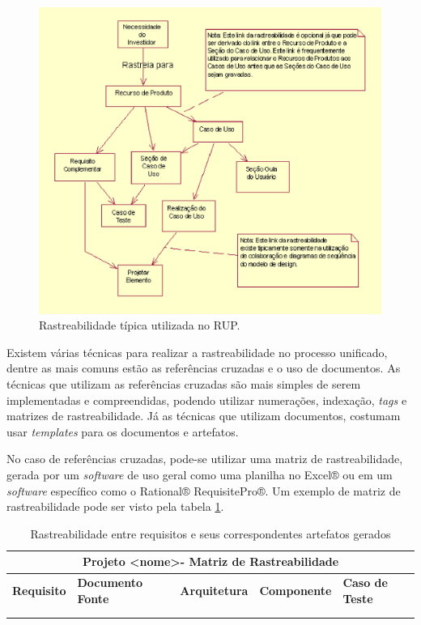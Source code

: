 \begin{figure}[htb]
\centering
  \includegraphics[keepaspectratio=true,scale=0.9]
  {figuras/rastreabilidade_tipica.eps}
  \caption{Rastreabilidade típica utilizada no RUP.~\cite{rup1}}
  \label{common-tracebility}
\end{figure}

\clearpage{}

Existem várias técnicas para realizar a rastreabilidade no processo unificado, dentre as mais comuns estão as referências cruzadas e o uso de documentos. As técnicas que utilizam as referências cruzadas são mais simples de serem implementadas e compreendidas, podendo utilizar numerações, indexação, \textit{tags} e matrizes de rastreabilidade. Já as técnicas que utilizam documentos, costumam usar \textit{templates} para os documentos e artefatos.

No caso de referências cruzadas, pode-se utilizar uma matriz de rastreabilidade, gerada por um \textit{software} de uso geral como uma planilha no Excel® ou em um \textit{software} específico como o Rational® RequisitePro®. Um exemplo de matriz de rastreabilidade pode ser visto pela tabela \ref{table1}.

\begin{table}[h]
\centering
\begin{tabular}{|l|l|l|l|l|}
\hline
\multicolumn{5}{|c|}{\textbf{Projeto \textless nome\textgreater - Matriz de Rastreabilidade}}           \\ \hline
\textbf{Requisito} & \textbf{Documento Fonte} & \multicolumn{1}{l|}{\textbf{Arquitetura}} & \textbf{Componente} & \textbf{Caso de Teste} \\ \hline
                   &                 &                                  &            &               \\ \hline
                   &                 &                                  &            &               \\ \hline
\end{tabular}
\caption{Rastreabilidade entre requisitos e seus correspondentes artefatos gerados}
\label{table1}
\end{table}

